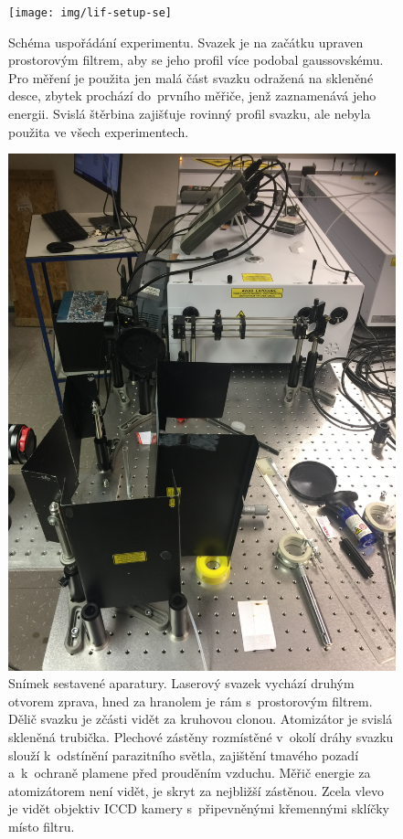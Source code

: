 \begin{figure}[htb]
	\centering
	\texttt{[image: img/lif-setup-se]}
	\caption{Schéma uspořádání experimentu.
		Svazek je na začátku upraven prostorovým filtrem,
		aby se jeho profil více podobal gaussovskému.
		Pro měření je použita jen malá část svazku odražená na skleněné desce,
		zbytek prochází do~prvního měřiče, jenž zaznamenává jeho energii.
		Svislá štěrbina zajišťuje rovinný profil svazku,
		ale nebyla použita ve všech experimentech.}
	\label{fig:lif-setup}
\end{figure}

\begin{figure}[htp]
	\centering
	\includegraphics[width=\textwidth, trim={0 24 0 0}, clip]
		{img/lif-setup-photo-1}
	\caption{Snímek sestavené aparatury.
		Laserový svazek vychází druhým otvorem zprava,
		hned za hranolem je rám s~prostorovým filtrem.
		Dělič svazku je zčásti vidět za kruhovou clonou.
		Atomizátor je svislá skleněná trubička.
		Plechové zástěny rozmístěné v~okolí dráhy svazku
		slouží k~odstínění parazitního světla,
		zajištění tmavého pozadí a~k~ochraně plamene před prouděním vzduchu.
		Měřič energie za atomizátorem není vidět, je skryt za nejbližší
		zástěnou.
		Zcela vlevo je vidět objektiv ICCD kamery s~připevněnými
		křemennými sklíčky místo filtru.}%
	\label{fig:lif-setup-photo}
\end{figure}

